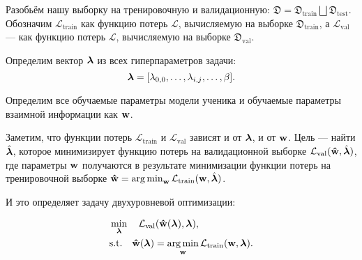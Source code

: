 Разобьём нашу выборку на тренировочную и валидационную: $\mathfrak{D} = \mathfrak{D}_\text{train} \bigsqcup \mathfrak{D}_\text{test}.$
Обозначим $\mathcal{L}_\text{train}$ как функцию потерь $\mathcal{L}$, вычисляемую на выборке $\mathfrak{D}_\text{train}$, а $\mathcal{L}_\text{val}$ ---
как  функцию потерь $\mathcal{L}$, вычисляемую на выборке $\mathfrak{D}_\text{val}$.

Определим вектор $\boldsymbol{\lambda}$ из всех гиперпараметров задачи:
$$\boldsymbol{\lambda} = [\lambda_{0, 0}, \ldots, \lambda_{i, j}, \ldots, \beta].$$

Определим все обучаемые параметры модели ученика и обучаемые параметры взаимной информации как $\bold{w}$.

Заметим, что функции потерь $\mathcal{L}_\text{train}$ и $\mathcal{L}_\text{val}$ зависят и от $\boldsymbol{\lambda}$, и от $\bold{w}$.
Цель --- найти $\hat{\boldsymbol{\lambda}}$, которое минимизирует функцию потерь на валидационной выборке $\mathcal{L}_\text{val}(\bold{\hat{w}}, \hat{\boldsymbol{\lambda}})$, где параметры $\bold{w}$
получаются в результате минимизации функции потерь на тренировочной выборке $\bold{\hat{w}} = \operatorname*{arg\,min}_{\bold{w}}{\mathcal{L}_\text{train}(\bold{w}, \hat{\boldsymbol{\lambda}})}$.

И это определяет задачу двухуровневой оптимизации\cite{darts}:

\begin{equation}
  \begin{aligned}
     & \min_{\boldsymbol{\lambda}} \quad \mathcal{L}_\text{val}(\bold{\hat{w}}(\boldsymbol{\lambda}), \boldsymbol{\lambda}),                               \\
     & \text{s.t.} \quad  \bold{\hat{w}}(\boldsymbol{\lambda}) = \operatorname*{arg\,min}_{\bold{w}}{\mathcal{L}_\text{train}(\bold{w}, \boldsymbol{\lambda})}.
  \end{aligned}
\end{equation}
